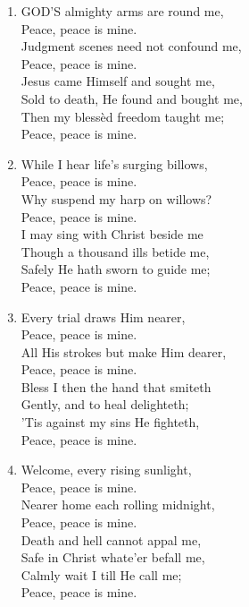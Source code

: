 \begin{enumerate}
    \item GOD'S almighty arms are round me, \\
        Peace, peace is mine. \\
        Judgment scenes need not confound me, \\
        Peace, peace is mine. \\
        Jesus came Himself and sought me, \\
        Sold to death, He found and bought me, \\
        Then my bless\`ed freedom taught me; \\
        Peace, peace is mine.

    \item While I hear life's surging billows, \\
        Peace, peace is mine. \\
        Why suspend my harp on willows? \\
        Peace, peace is mine. \\
        I may sing with Christ beside me \\
        Though a thousand ills betide me, \\
        Safely He hath sworn to guide me; \\
        Peace, peace is mine.

    \item Every trial draws Him nearer, \\
        Peace, peace is mine. \\
        All His strokes but make Him dearer, \\
        Peace, peace is mine. \\
        Bless I then the hand that smiteth \\
        Gently, and to heal delighteth; \\
        'Tis against my sins He fighteth, \\
        Peace, peace is mine.

    \item Welcome, every rising sunlight, \\
        Peace, peace is mine. \\
        Nearer home each rolling midnight, \\
        Peace, peace is mine. \\
        Death and hell cannot appal me, \\
        Safe in Christ whate'er befall me, \\
        Calmly wait I till He call me; \\
        Peace, peace is mine.

\end{enumerate}

